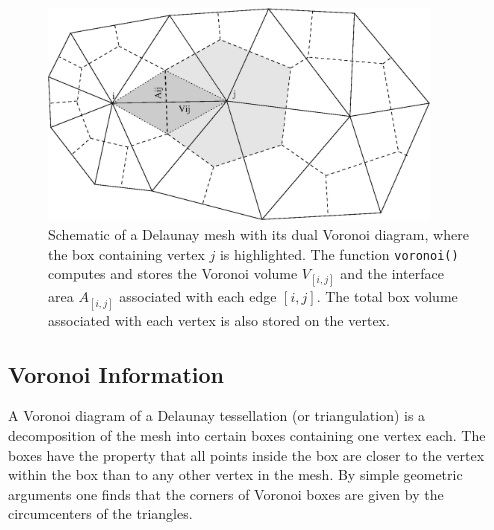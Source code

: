 \begin{figure}[tb]
\centering
 \includegraphics[width=0.9\textwidth]{figures/voronoi.eps}
 \caption{Schematic of a Delaunay mesh with its dual Voronoi diagram, where the box containing vertex $j$ is highlighted.
    The function \lstinline|voronoi()| computes and stores the Voronoi volume $V_{[i,j]}$ and the interface area $A_{[i,j]}$ associated with each edge $[i,j]$.
    The total box volume associated with each vertex is also stored on the vertex.}
 \label{fig:voronoi}
\end{figure}

 \subsection{Voronoi Information}
 A Voronoi diagram of a Delaunay tessellation (or triangulation) is a decomposition of the mesh into certain boxes containing one vertex each.
 The boxes have the property that all points inside the box are closer to the vertex within the box than to any other vertex in the mesh.
 By simple geometric arguments one finds that the corners of Voronoi boxes are given by the circumcenters of the triangles.

